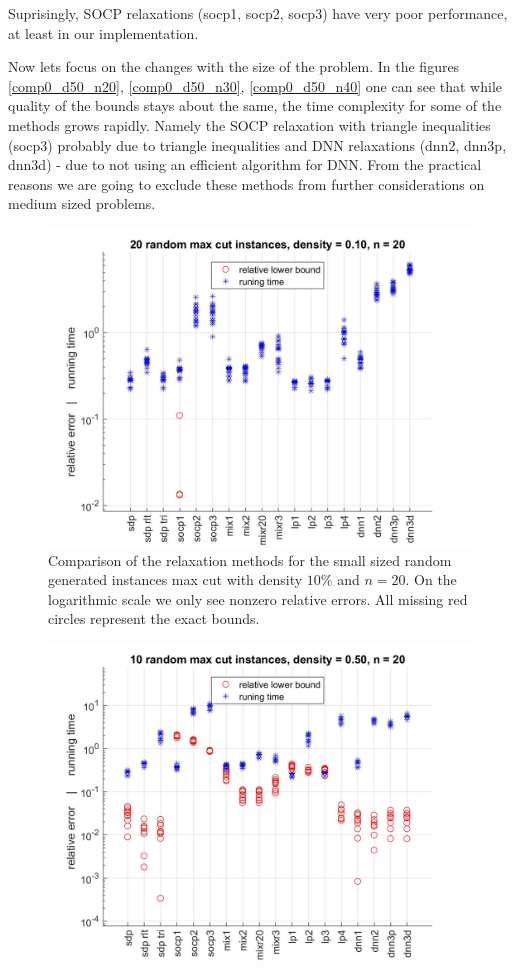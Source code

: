 \documentclass[12pt]{book}
\theoremstyle{definition}
\begin{document}
Suprisingly, SOCP relaxations (socp1, socp2, socp3) have very poor performance, at least in our implementation.


Now lets focus on the changes with the size of the problem. In the figures \ref{comp0_d50_n20}, \ref{comp0_d50_n30}, \ref{comp0_d50_n40} one can see that while quality of the bounds stays about the same, the time complexity for some of the methods grows rapidly. Namely the SOCP relaxation with triangle inequalities (socp3) probably due to triangle inequalities and DNN relaxations (dnn2, dnn3p, dnn3d) - due to not using an efficient algorithm for DNN. From the practical reasons we are going to exclude these methods from further considerations on medium sized problems.

\begin{center}
\begin{figure}
\includegraphics[scale = 0.27]{img/comp0_d10_n20.jpg}
\caption[Comparison of relaxations - small, sparse instances of max cut]{Comparison of the relaxation methods for the small sized random generated instances max cut with density $10\%$ and $n=20$. On the logarithmic scale we only see nonzero relative errors. All missing red circles represent the exact bounds.}
\label{comp0_d10_n20}
\end{figure}
\begin{figure}
\includegraphics[scale=0.27]{img/comp0_d50_n20.jpg}

\end{figure}
\end{center}
\end{document}
